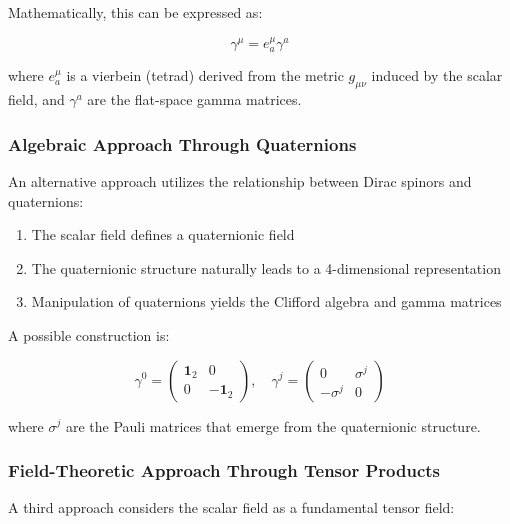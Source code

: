 \documentclass[12pt,a4paper]{article}
\begin{document}
	Mathematically, this can be expressed as:
	
	\begin{equation}
		\gamma^{\mu} = e^{\mu}_a \gamma^a
		\label{eq:vierbein_relation}
	\end{equation}
	
	where $e^{\mu}_a$ is a vierbein (tetrad) derived from the metric $g_{\mu\nu}$ induced by the scalar field, and $\gamma^a$ are the flat-space gamma matrices.
	
	\subsubsection{Algebraic Approach Through Quaternions}
	\label{subsubsec:quaternion_approach}
	
	An alternative approach utilizes the relationship between Dirac spinors and quaternions:
	
	\begin{enumerate}
		\item The scalar field defines a quaternionic field
		\item The quaternionic structure naturally leads to a 4-dimensional representation
		\item Manipulation of quaternions yields the Clifford algebra and gamma matrices
	\end{enumerate}
	
	A possible construction is:
	
	\begin{equation}
		\gamma^0 = \begin{pmatrix} \mathbf{1}_2 & 0 \\ 0 & -\mathbf{1}_2 \end{pmatrix}, \quad
		\gamma^j = \begin{pmatrix} 0 & \sigma^j \\ -\sigma^j & 0 \end{pmatrix}
		\label{eq:gamma_construction}
	\end{equation}
	
	where $\sigma^j$ are the Pauli matrices that emerge from the quaternionic structure.
	
	\subsubsection{Field-Theoretic Approach Through Tensor Products}
	\label{subsubsec:tensor_approach}
	
	A third approach considers the scalar field as a fundamental tensor field:
	
\end{document}
